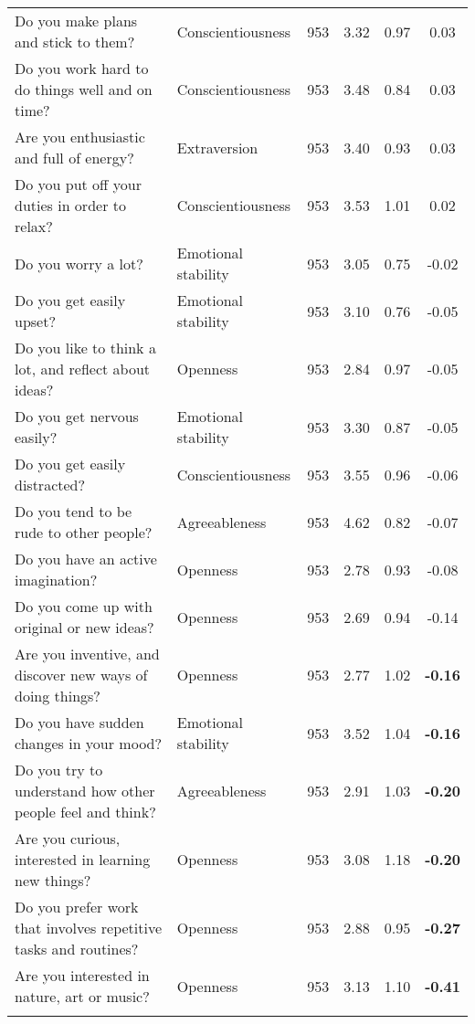 \begin{table}[htbp]
{\begin{tabular}{llcccc}
    Do you make plans and stick to them? & Conscientiousness & 953   & 3.32  & 0.97  & 0.03 \\
    Do you work hard to do things well and on time? & Conscientiousness & 953   & 3.48  & 0.84  & 0.03 \\
    Are you enthusiastic and full of energy? & Extraversion & 953   & 3.40  & 0.93  & 0.03 \\
    Do you put off your duties in order to relax? & Conscientiousness & 953   & 3.53  & 1.01  & 0.02 \\
    Do you worry a lot? & Emotional stability & 953   & 3.05  & 0.75  & -0.02 \\
    Do you get easily upset? & Emotional stability & 953   & 3.10  & 0.76  & -0.05 \\
    Do you like to think a lot, and reflect about ideas? & Openness & 953   & 2.84  & 0.97  & -0.05 \\
    Do you get nervous easily? & Emotional stability & 953   & 3.30  & 0.87  & -0.05 \\
    Do you get easily distracted? & Conscientiousness & 953   & 3.55  & 0.96  & -0.06 \\
    Do you tend to be rude to other people? & Agreeableness & 953   & 4.62  & 0.82  & -0.07 \\
    Do you have an active imagination? & Openness & 953   & 2.78  & 0.93  & -0.08 \\
    Do you come up with original or new ideas? & Openness & 953   & 2.69  & 0.94  & -0.14 \\
    Are you inventive, and discover new ways of doing things? & Openness & 953   & 2.77  & 1.02  & \textbf{-0.16} \\
    Do you have sudden changes in your mood? & Emotional stability & 953   & 3.52  & 1.04  & \textbf{-0.16} \\
    Do you try to understand how other people feel and think? & Agreeableness & 953   & 2.91  & 1.03  & \textbf{-0.20} \\
    Are you curious, interested in learning new things? & Openness & 953   & 3.08  & 1.18  & \textbf{-0.20} \\
    Do you prefer work that involves repetitive tasks and routines? & Openness & 953   & 2.88  & 0.95  & \textbf{-0.27} \\
    Are you interested in nature, art or music? & Openness & 953   & 3.13  & 1.10  & \textbf{-0.41} \\
    \bottomrule
	\Tablenote{6}{Most contributive variables (represented with \textbf{bold font}) are used to interpret factor.} \\
    \end{tabular}%
	}
  \label{tab:factor5}%
\end{table}%
